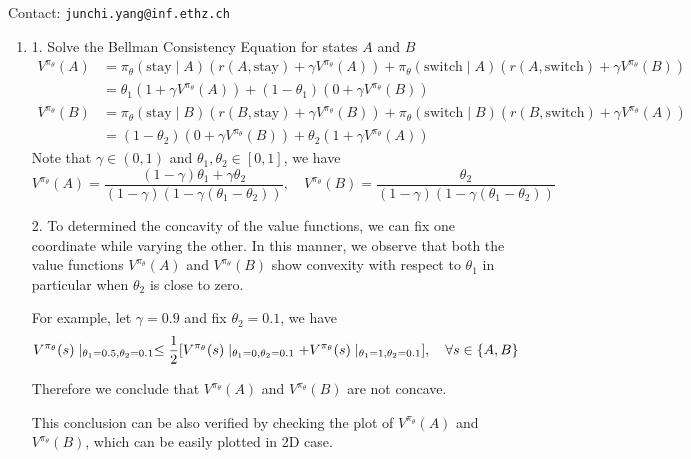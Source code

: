 Contact: \texttt{junchi.yang@inf.ethz.ch}

\begin{Solution}
    \begin{enumerate} [label=\alph*)]
        \item
        1. Solve the Bellman Consistency Equation for states $A$ and $B$
        $$
        \begin{aligned}
        V^{\pi_\theta}(A) & = \pi_\theta (\text{stay} \mid A) (r(A, \text{stay}) + \gamma V^{\pi_\theta}(A)) + \pi_\theta (\text{switch} \mid A) (r(A, \text{switch}) + \gamma V^{\pi_\theta}(B)) \\
        & = \theta_1 (1 + \gamma V^{\pi_\theta}(A)) + (1 - \theta_1)(0 + \gamma V^{\pi_\theta}(B)) \\
        V^{\pi_\theta}(B) & = \pi_\theta (\text{stay} \mid B) (r(B, \text{stay}) + \gamma V^{\pi_\theta}(B)) + \pi_\theta (\text{switch} \mid B) (r(B, \text{switch}) + \gamma V^{\pi_\theta}(A)) \\
        & = (1 - \theta_2)(0 + \gamma V^{\pi_\theta}(B)) + \theta_2 (1 + \gamma V^{\pi_\theta}(A))
        \end{aligned}
        $$
        Note that $\gamma \in (0,1)$ and $\theta_1, \theta_2 \in [0,1]$, we have
        $$
        V^{\pi_\theta}(A) = \dfrac{(1 - \gamma) \theta_1 + \gamma \theta_2}{(1 - \gamma)(1 - \gamma (\theta_1 - \theta_2))}, \quad 
        V^{\pi_\theta}(B) = \dfrac{\theta_2}{(1 - \gamma)(1 - \gamma (\theta_1 - \theta_2))}
        $$
        \vspace{1em}
        
        2. To determined the concavity of the value functions, we can fix one coordinate while varying the other. In this manner, we observe that both the value functions $V^{\pi_\theta}(A)$ and $V^{\pi_\theta}(B)$ show convexity with respect to $\theta_1$ in particular when $\theta_2$ is close to zero.
        
        For example, let $\gamma = 0.9$ and fix $\theta_2 = 0.1$, we have
        $$
        V^{\pi_\theta}(s) \mid_{\theta_1 = 0.5, \theta_2 = 0.1} \leq \dfrac{1}{2} {\left[V^{\pi_\theta}(s) \mid_{\theta_1 = 0, \theta_2 = 0.1} + V^{\pi_\theta}(s) \mid_{\theta_1 = 1, \theta_2 = 0.1}\right]}, \quad \forall s \in \{A, B\}
        $$
        
        Therefore we conclude that $V^{\pi_\theta}(A)$ and $V^{\pi_\theta}(B)$ are not concave.
        
        This conclusion can be also verified by checking the plot of $V^{\pi_\theta}(A)$ and $V^{\pi_\theta}(B)$, which can be easily plotted in 2D case.
        

\end{enumerate}
\end{Solution}
